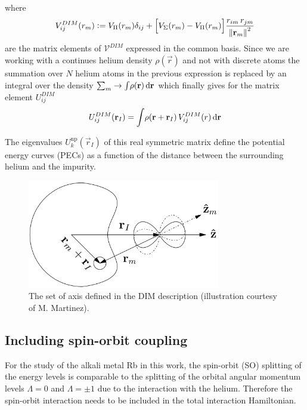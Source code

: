 			where
			\begin{align}
				V^{DIM}_{ij}(r_m) \vcentcolon= V_\Pi(r_m)\delta_{ij}+\qty\Big[V_\Sigma(r_m)-V_\Pi(r_m)]\frac{r_{im}\,r_{jm}}{\norm{\bm{\mathrm{r}}_m}^2} \label{eq:vdim}
			\end{align}
			are the matrix elements of $\mathcal{V}^{DIM}$ expressed in the common basis. Since we are working with a continues helium density $\rho(\vec{r})$ and not with discrete atoms the summation over $N$ helium atoms in the previous expression is replaced by an integral over the density $\sum_m\rightarrow\int\!\rho(\bm{\mathrm{r}})\,\mathrm{d}{\bm{\mathrm{r}}}$ which finally gives for the matrix element $U^{DIM}_{ij}$
			\begin{align}
				U^{DIM}_{ij}(\bm{\mathrm{r}}_I) = \int\! \rho\qty(\bm{\mathrm{r}}+\bm{\mathrm{r}}_I)\,V^{DIM}_{ij}(r)\,\mathrm{d}{\bm{\mathrm{r}}} \label{eq:u-dim}
			\end{align}
			
			The eigenvalues $U^{\mathrm{np}}_k(\vec{r}_I)$ of this real symmetric matrix define the potential energy curves (PECs) as a function of the distance between the surrounding helium and the impurity.
			\begin{figure}[t]
				\begin{center}
					\includegraphics[width=0.75\textwidth]{dim-axes}
				\end{center}
				\caption{The set of axis defined in the DIM description (illustration courtesy of M. Martinez).}
				\label{fig:dim-axes}
			\end{figure}			
		
		\subsection{Including spin-orbit coupling}
			For the study of the alkali metal Rb in this work, the spin-orbit (SO) splitting of the energy levels is comparable to the splitting of the orbital angular momentum levels $\Lambda=0$ and $\Lambda=\pm 1$ due to the interaction with the helium. Therefore the spin-orbit interaction needs to be included in the total interaction Hamiltonian.\\
			
